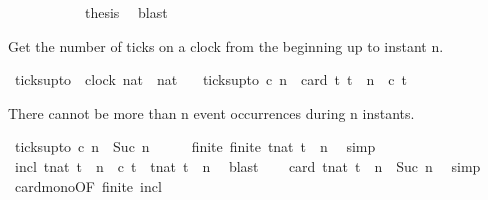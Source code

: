 \begin{isabellebody}
\isanewline
\ \ \isamarkupfalse%
\isanewline
\ \ \isamarkupfalse%
\ {}\ \ {}\ \isamarkupfalse%
\ {\isacharquery}thesis\ \isamarkupfalse%
\ blast\isanewline
{}\isamarkupfalse%
%
\endisatagproof
{\isafoldproof}%
%
\isadelimproof
%
\endisadelimproof
%
\begin{isamarkuptext}%
Get the number of ticks on a clock from the beginning up to instant n.%
\end{isamarkuptext}\isamarkuptrue%
\isamarkupfalse%
\ ticks{\isacharunderscore}up{\isacharunderscore}to\ {\isacharcolon}{\isacharcolon}\ {\isacartoucheopen}{\isacharbrackleft}clock{\isacharcomma}\ nat{\isacharbrackright}\ {\isasymRightarrow}\ nat{\isacartoucheclose}\isanewline
\ \ \ {\isacartoucheopen}ticks{\isacharunderscore}up{\isacharunderscore}to\ c\ n\ {\isacharequal}\ card\ {\isacharbraceleft}t{\isachardot}\ t\ {\isasymle}\ n\ {\isasymand}\ c\ t{\isacharbraceright}{\isacartoucheclose}%
\begin{isamarkuptext}%
There cannot be more than n event occurrences during n instants.%
\end{isamarkuptext}\isamarkuptrue%
\isamarkupfalse%
\ {\isacartoucheopen}ticks{\isacharunderscore}up{\isacharunderscore}to\ c\ n\ {\isasymle}\ Suc\ n{\isacartoucheclose}\isanewline
%
\isadelimproof
%
\endisadelimproof
%
\isatagproof
{}\isamarkupfalse%
\ {\isacharminus}\isanewline
\ \ \isamarkupfalse%
\ finite{\isacharcolon}\ {\isacartoucheopen}finite\ {\isacharbraceleft}t{\isacharcolon}{\isacharcolon}nat{\isachardot}\ t\ {\isasymle}\ n{\isacharbraceright}{\isacartoucheclose}\ \isamarkupfalse%
\ simp\isanewline
\ \ \isamarkupfalse%
\ incl{\isacharcolon}\ {\isacartoucheopen}{\isacharbraceleft}t{\isacharcolon}{\isacharcolon}nat{\isachardot}\ t\ {\isasymle}\ n\ {\isasymand}\ c\ t{\isacharbraceright}\ {\isasymsubseteq}\ {\isacharbraceleft}t{\isacharcolon}{\isacharcolon}nat{\isachardot}\ t\ {\isasymle}\ n{\isacharbraceright}{\isacartoucheclose}\ \isamarkupfalse%
\ blast\isanewline
\ \ \isamarkupfalse%
\ {\isacartoucheopen}card\ {\isacharbraceleft}t{\isacharcolon}{\isacharcolon}nat{\isachardot}\ t\ {\isasymle}\ n{\isacharbraceright}\ {\isacharequal}\ Suc\ n{\isacartoucheclose}\ \isamarkupfalse%
\ simp\isanewline
\ \ \isamarkupfalse%
\ card{\isacharunderscore}mono{\isacharbrackleft}OF\ finite\ incl{\isacharbrackright}\ \isamarkupfalse%

\end{isabellebody}
